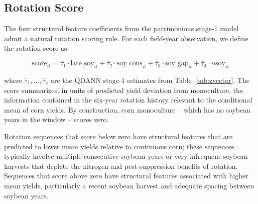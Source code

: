 \documentclass[12pt,letterpaper]{article}
\theoremstyle{remark}
\theoremstyle{remark}
\theoremstyle{plain}
\theoremstyle{definition}
\begin{document}
\subsection{\label{subsec:rot_score}Rotation Score}
The four structural feature coefficients from the parsimonious stage-1 model admit a natural rotation scoring rule. For each field-year observation, we define the rotation score as:

\begin{equation}
    \text{score}_{it} = \hat{\tau}_1 \cdot \text{late\_soy}_{it} + \hat{\tau}_2 \cdot \text{soy\_cons}_{it} + \hat{\tau}_3 \cdot \text{soy\_gap}_{it} + \hat{\tau}_4 \cdot n\text{soy}_{it}\label{eq:score}
\end{equation}

where $\hat{\tau}_1, \ldots, \hat{\tau}_4$ are the QDANN stage-1 estimates from Table~\ref{tab:zvector}. The score summarizes, in units of predicted yield deviation from monoculture, the information contained in the six-year rotation history relevant to the conditional mean of corn yields. By construction, corn monoculture -- which has no soybean years in the window -- scores zero.

Rotation sequences that score below zero have structural features that are predicted to lower mean yields relative to continuous corn; these sequences typically involve multiple consecutive soybean years or very infrequent soybean harvests that deplete
the nitrogen and pest-suppression benefits of rotation. Sequences that score above zero have structural features associated with higher mean yields, particularly a recent soybean harvest and adequate spacing between soybean years.

\end{document}
